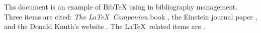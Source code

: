 \documentclass{article}
\begin{document}
	Ths document is an example of BibTeX using in bibliography management. Three items 
	are cited: \textit{The \LaTeX\ Companion} book \cite{latexcompanion}, the Einstein
	journal paper \cite{einstein}, and the Donald Knuth's website \cite{knuthwebsite}. 
	The \LaTeX\ related items are \cite{latexcompanion,knuthwebsite}. 
	
	
\end{document}
